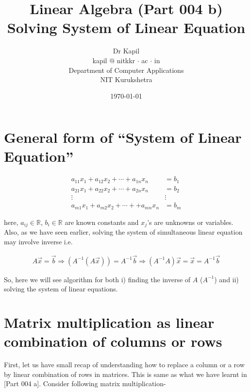 \documentclass{article}
\title{Linear Algebra (Part 004 b)\\Solving System of Linear Equation}
\author{Dr Kapil\\kapil $@$ nitkkr $\cdot$ ac $\cdot$ in\\Department of Computer Applications\\ NIT Kurukshetra}
\date{\today}
\begin{document}
    \maketitle
    \thispagestyle{fancy}

\section{General form of ``System of Linear Equation''}
\begin{align}
    a_{11}x_1 + a_{12}x_2 + \cdots + a_{1n}x_n &= b_1 \nonumber\\
    a_{21}x_1 + a_{22}x_2 + \cdots + a_{2n}x_n &= b_2 \nonumber\\
    \vdots     ~~~~~~~~~~~~~~~~~~~~~~          & \vdots\nonumber\\
    a_{m1}x_1 + a_{m2}x_2 + \cdots+ + a_{mn}x_n &= b_m \nonumber
\end{align}

here, $a_{ij} \in \mathbb{R}$, $b_{i} \in \mathbb{R}$ are known constants and $x_j$'s are unknowns or variables. Also, as we have seen earlier, solving the system of simultaneous linear equation may involve inverse i.e.

\begin{align}
    A\vec{x} = \vec{b} \Rightarrow (A^{-1}(A\vec{x})) = A^{-1}\vec{b} \Rightarrow (A^{-1}A)\vec{x}  = \vec{x} = A^{-1}\vec{b} \nonumber
\end{align}

So, here we will see algorithm for both i) finding the inverse of $A$ ($A^{-1}$) and ii) solving the system of linear equations. 



\section{Matrix multiplication as linear combination of columns or rows}    
First, let us have small recap of understanding how to replace a column or a row by linear combination of rows in matrices. This is same as what we have learnt in [Part 004 a]. Consider following matrix multiplication-
\end{document}
